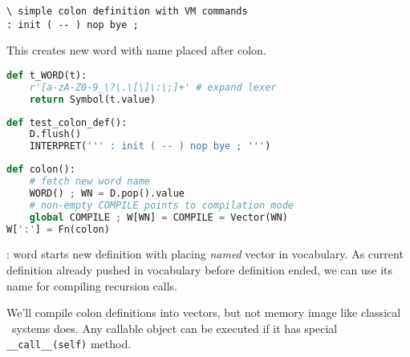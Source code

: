 \clearpage{}

\begin{lstlisting}[language=Forth]
\ simple colon definition with VM commands
: init ( -- ) nop bye ;
\end{lstlisting}

\noindent This  creates new word with name placed after
colon. 

\begin{lstlisting}[language=Python]
def t_WORD(t):
    r'[a-zA-Z0-9_\?\.\[\]\:\;]+' # expand lexer
    return Symbol(t.value)
\end{lstlisting}


\begin{lstlisting}[language=Python]
def test_colon_def():
    D.flush()
    INTERPRET(''' : init ( -- ) nop bye ; ''')
\end{lstlisting}

\begin{lstlisting}[language=Python]
def colon():
	# fetch new word name
	WORD() ; WN = D.pop().value
	# non-empty COMPILE points to compilation mode
	global COMPILE ; W[WN] = COMPILE = Vector(WN)
W[':'] = Fn(colon)
\end{lstlisting}

\medskip\noindent
: word starts new definition with placing \emph{named} vector in vocabulary. As
current definition already pushed in vocabulary before definition ended, we can
use its name for compiling recursion calls.

We'll compile colon definitions into vectors, but not memory image like
classical \F\ systems does. Any callable object can be executed if it has
special \verb|__call__(self)| method.
